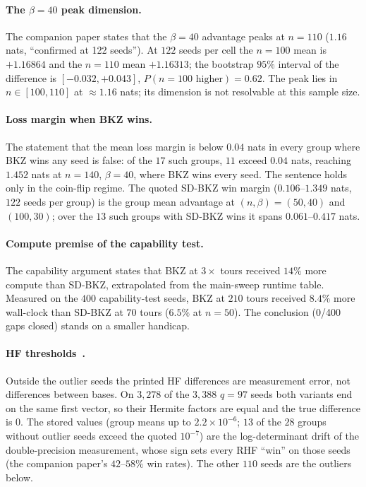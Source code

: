 \documentclass[journal=cic,version=preprint]{iacrj}
\begin{document}
\paragraph{The $\beta=40$ peak dimension.} The companion paper states that the
$\beta=40$ advantage peaks at $n=110$ ($1.16$ nats, ``confirmed at 122 seeds'').
At $122$ seeds per cell the $n=100$ mean is $+1.16864$ and the $n=110$ mean
$+1.16313$; the bootstrap $95\%$ interval of the difference is
$[-0.032,+0.043]$, $P(n=100\text{ higher})=0.62$. The peak lies in
$n\in[100,110]$ at ${\approx}1.16$ nats; its dimension is not resolvable at
this sample size.

\paragraph{Loss margin when BKZ wins.} The statement that the mean loss margin
is below $0.04$ nats in every group where BKZ wins any seed is false: of the
$17$ such groups, $11$ exceed $0.04$ nats, reaching $1.452$ nats at $n=140$,
$\beta=40$, where BKZ wins every seed. The sentence holds only in the
coin-flip regime. The quoted SD-BKZ win margin ($0.106$--$1.349$ nats, $122$ seeds per group) is
the group mean advantage at $(n,\beta)=(50,40)$ and $(100,30)$; over the
$13$ such groups with SD-BKZ wins it spans $0.061$--$0.417$ nats.

\paragraph{Compute premise of the capability test.} The capability argument
states that BKZ at $3\times$ tours received $14\%$ more compute than SD-BKZ,
extrapolated from the main-sweep runtime table. Measured on the
$400$ capability-test seeds, BKZ at $210$ tours received $8.4\%$ more
wall-clock than SD-BKZ at $70$ tours ($6.5\%$ at $n=50$). The conclusion
(0/400 gaps closed) stands on a smaller handicap.

\paragraph{HF thresholds~\cite[\S4, abstract]{Paper1}.} Outside the outlier
seeds the printed HF differences are measurement error, not differences
between bases. On $3{,}278$ of the $3{,}388$ $q=97$ seeds both variants end
on the same first vector, so their Hermite factors are equal and the true
difference is $0$. The stored values (group means up to $2.2\times10^{-6}$;
$13$ of the $28$ groups without outlier seeds exceed the quoted $10^{-7}$)
are the log-determinant drift of the double-precision measurement, whose
sign sets every RHF ``win'' on those seeds (the companion paper's $42$--$58\%$
win rates). The other $110$ seeds are the outliers below.
\end{document}
